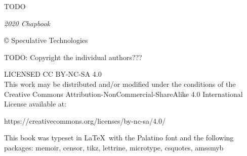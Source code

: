 



\pagestyle{empty}

{
\null\vfill

\begin{flushleft}

{\small
TODO

\textit{2020 Chapbook}


© Speculative Technologies

TODO: Copyright the individual authors???

\bigskip


LICENSED CC BY-NC-SA 4.0 \\
This work may be distributed and/or modified under the conditions of the Creative Commons Attribution-NonCommercial-ShareAlike 4.0 International License available at:
\begin{chatlog}
https://creativecommons.org/licenses/by-nc-sa/4.0/
\end{chatlog}

This book was typeset in \LaTeX\ with the Palatino font and the following packages:
  memoir,
  censor,
  tikz,
  lettrine,
  microtype,
  csquotes,
  amssmyb

\bigskip

}


\end{flushleft}
}


\clearpage

\titleAM



\frontmatter

{\setlength{\beforechapskip}{0pt}
\begin{KeepFromToc}
  \tableofcontents*
\end{KeepFromToc}
}

\mainmatter
\raggedbottom

\pagestyle{plain}



